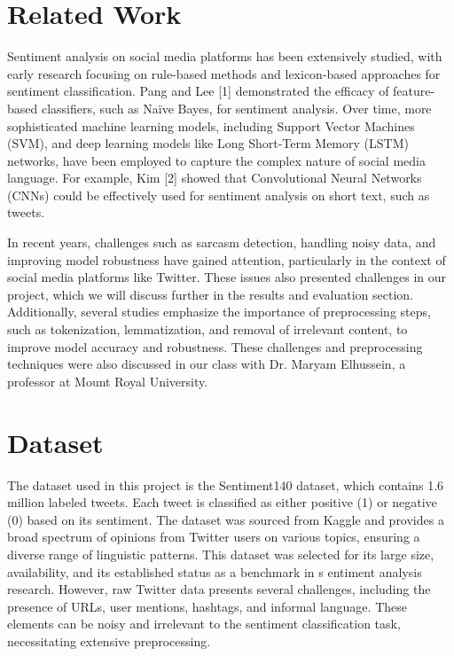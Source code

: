 \documentclass[conference]{IEEEtran}
\begin{document}
\section{Related Work}
Sentiment analysis on social media platforms has been extensively studied, with early research focusing on rule-based methods and lexicon-based approaches 
for sentiment classification. Pang and Lee [1] demonstrated the efficacy of feature-based classifiers, such as Naïve Bayes, for sentiment analysis. Over time, 
more sophisticated machine learning models, including Support Vector Machines (SVM), and deep learning models like Long Short-Term Memory (LSTM) networks, 
have been employed to capture the complex nature of social media language.
For example, Kim [2] showed that Convolutional Neural Networks (CNNs) could be effectively used for sentiment analysis on short text, such as tweets.

In recent years, challenges such as sarcasm detection, handling noisy data, and improving model robustness have gained attention, particularly 
in the context of social media platforms like Twitter. These issues also presented challenges in our project, which we will discuss further in the results 
and evaluation section. Additionally, several studies emphasize the importance of preprocessing steps, such as tokenization, lemmatization, and removal of 
irrelevant content, to improve model accuracy and robustness. These challenges and preprocessing techniques were also discussed in our class with Dr. Maryam Elhussein,
 a professor at Mount Royal University.


\section{Dataset}
The dataset used in this project is the Sentiment140 dataset, which contains 1.6 million labeled tweets. Each tweet is classified as either positive 
(1) or negative (0) based on its sentiment. The dataset was sourced from Kaggle and provides a broad spectrum of opinions from Twitter users on various topics,
 ensuring a diverse range of linguistic patterns. This dataset was selected for its large size, availability, and its established status as a benchmark in s
 entiment analysis research. However, raw Twitter data presents several challenges, including the presence of URLs, user mentions, hashtags, and informal language. 
 These elements can be noisy and irrelevant to the sentiment classification task, necessitating extensive preprocessing.
\end{document}
